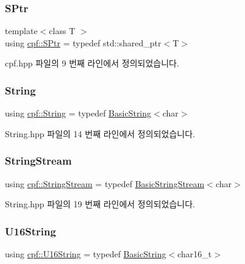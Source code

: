 \subsubsection{\texorpdfstring{S\+Ptr}{SPtr}}
{\footnotesize\ttfamily template$<$class T $>$ \\
using \hyperlink{namespacecpf_a91e72db639307e12a24546a0eebb1a42}{cpf\+::\+S\+Ptr} = typedef std\+::shared\+\_\+ptr$<$T$>$}



cpf.\+hpp 파일의 9 번째 라인에서 정의되었습니다.

\mbox{\label{namespacecpf_a4dbd6992c3ed4440ce7ed8982ff7ffea}} 
\subsubsection{\texorpdfstring{String}{String}}
{\footnotesize\ttfamily using \hyperlink{namespacecpf_a4dbd6992c3ed4440ce7ed8982ff7ffea}{cpf\+::\+String} = typedef \hyperlink{namespacecpf_ac91c8c57a370a5bef21ac23f876ad536}{Basic\+String}$<$char$>$}



String.\+hpp 파일의 14 번째 라인에서 정의되었습니다.

\mbox{\label{namespacecpf_a6e5583a51165e808f1a480563a2d98b2}} 
\subsubsection{\texorpdfstring{String\+Stream}{StringStream}}
{\footnotesize\ttfamily using \hyperlink{namespacecpf_a6e5583a51165e808f1a480563a2d98b2}{cpf\+::\+String\+Stream} = typedef \hyperlink{namespacecpf_a1fe334b3d2422535a1cfe51785d98cb8}{Basic\+String\+Stream}$<$char$>$}



String.\+hpp 파일의 19 번째 라인에서 정의되었습니다.

\mbox{\label{namespacecpf_a32926a91098f8ea8d354b9f234b75acc}} 
\subsubsection{\texorpdfstring{U16\+String}{U16String}}
{\footnotesize\ttfamily using \hyperlink{namespacecpf_a32926a91098f8ea8d354b9f234b75acc}{cpf\+::\+U16\+String} = typedef \hyperlink{namespacecpf_ac91c8c57a370a5bef21ac23f876ad536}{Basic\+String}$<$char16\+\_\+t$>$}



